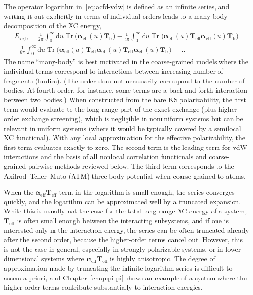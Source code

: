 The operator logarithm in~\eqref{eq:acfd-vdw} is defined as an infinite series, and writing it out explicitly in terms of individual orders leads to a many-body decomposition of the XC energy,
\begin{multline}
  E_\text{xc,lr}=
  \textstyle\frac1{2\pi}\int_0^\infty\mathrm du\operatorname{Tr}\big(\boldsymbol\alpha_\text{eff}(u)\mathbf T_\text{lr}\big)
  -\frac1{4\pi}\int_0^\infty\mathrm du\operatorname{Tr}\big(\boldsymbol\alpha_\text{eff}(u)\mathbf T_\text{eff}\boldsymbol\alpha_\text{eff}(u)\mathbf T_\text{lr}\big) \\
  \textstyle+\frac1{6\pi}\int_0^\infty\mathrm du\operatorname{Tr}\big(\boldsymbol\alpha_\text{eff}(u)\mathbf T_\text{eff}\boldsymbol\alpha_\text{eff}(u)\mathbf T_\text{eff}\boldsymbol\alpha_\text{eff}(u)\mathbf T_\text{lr}\big)
  -\ldots
\end{multline}
The name ``many-body'' is best motivated in the coarse-grained models where the individual terms correspond to interactions between increasing number of fragments (bodies).
(The order does not necessarily correspond to the number of bodies.
At fourth order, for instance, some terms are a back-and-forth interaction between two bodies.)
When constructed from the bare KS polarizability, the first term would evaluate to the long-range part of the exact exchange (plus higher-order exchange screening), which is negligible in nonuniform systems but can be relevant in uniform systems (where it would be typically covered by a semilocal XC functional).
With any local approximation for the effective polarizability, the first term evaluates exactly to zero.
The second term is the leading term for vdW interactions and the basis of all nonlocal correlation functionals and coarse-grained pairwise methods reviewed below.
The third term corresponds to the Axilrod--Teller--Muto (ATM) three-body potential \citep{AxilrodJCP43,MutoNS43} when coarse-grained to atoms.

When the $\boldsymbol\alpha_\text{eff}\mathbf T_\text{eff}$ term in the logarithm is small enough, the series converges quickly, and the logarithm can be approximated well by a truncated expansion.
While this is usually not the case for the total long-range XC energy of a system, $\mathbf T_\text{eff}$ is often small enough between the interacting subsystems, and if one is interested only in the interaction energy, the series can be often truncated already after the second order, because the higher-order terms cancel out.
However, this is not the case in general, especially in strongly polarizable systems, or in lower-dimensional systems where $\boldsymbol\alpha_\text{eff}\mathbf T_\text{eff}$ is highly anisotropic.
The degree of approximation made by truncating the infinite logarithm series is difficult to assess a priori, and Chapter~\ref{chap:pi-pi} shows an example of a system where the higher-order terms contribute substantially to interaction energies.


